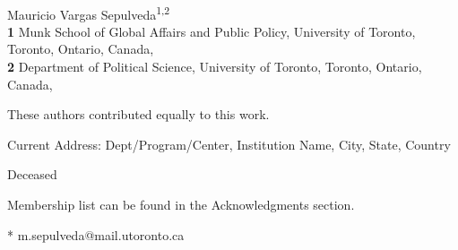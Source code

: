 \documentclass[
  10pt,
  letterpaper,
]{article}
\begin{document}
\vspace*{0.2in}

\begin{flushleft}
{\Large
\textbf{} %
}
\newline
\\
Mauricio Vargas Sepulveda\textsuperscript{1,2\Yinyang*}
\\
\bigskip
\textbf{1} Munk School of Global Affairs and Public Policy, University
of Toronto, Toronto, Ontario, Canada, \\ \textbf{2} Department of
Political Science, University of Toronto, Toronto, Ontario, Canada, 
\bigskip

% 
%
\Yinyang These authors contributed equally to this work.


\textcurrency Current Address: Dept/Program/Center, Institution Name, City, State, Country %

\dag Deceased

\textpilcrow Membership list can be found in the Acknowledgments section.

* m.sepulveda@mail.utoronto.ca

\end{flushleft}
\end{document}
